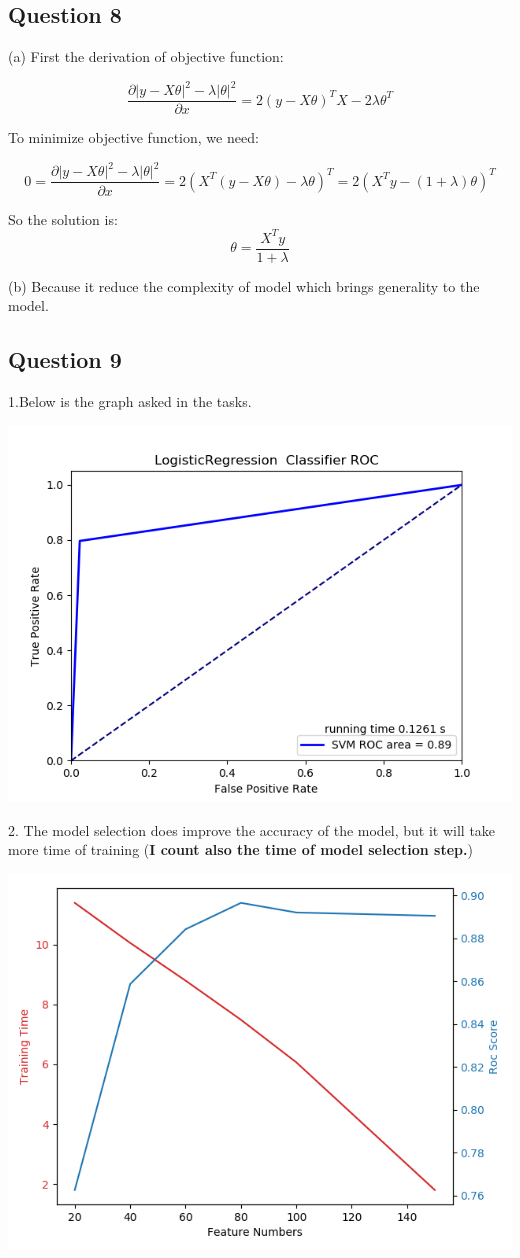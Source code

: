 \documentclass{article}
\begin{document}
\subsection{Question 8}

(a) First the derivation of objective function:

\begin{equation*}
	\frac{\partial |y-X\theta|^2-\lambda|\theta|^2}{\partial x}=2\left(y-X\theta\right)^T X-2\lambda \theta^T
\end{equation*}

To minimize objective function, we need:

\begin{equation*}
	0=\frac{\partial |y-X\theta|^2-\lambda|\theta|^2}{\partial x}=2\left(X^T\left(y-X\theta\right)-\lambda \theta\right)^T=2\left(X^Ty- (1+\lambda) \theta\right)^T
\end{equation*}

So the solution is:
$$\theta=\frac{X^Ty}{1+\lambda}$$

(b) Because it reduce the complexity of model which brings generality to the model.
\subsection{Question 9}
1.Below is the graph asked in the tasks. 

\includegraphics{MA2823MLAssignment_1/MA2823-ML-Assignment_1/Roc_Curve}

2. The model selection does improve the accuracy of the model, but it will take more time of training (\textbf{I count also the time of model selection step.})

\includegraphics{MA2823MLAssignment_1/MA2823-ML-Assignment_1/Comparison}
\end{document}
